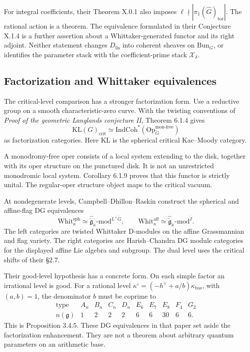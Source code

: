For integral coefficients, their Theorem X.0.1 also imposes
\(\ell\nmid|\pi_1(\widehat G)_{\mathrm{tor}}|\).
The rational action is a theorem. The equivalence formulated
in their Conjecture X.1.4 is a further assertion about a
Whittaker-generated functor and its right adjoint.
Neither statement changes \(D_{\mathrm{lis}}\) into coherent
sheaves on \(\mathrm{Bun}_G\), or identifies the parameter stack
with the coefficient-prime stack \(\mathcal X_\delta\).



\subsection{Factorization and Whittaker equivalences}

The critical-level comparison has a stronger factorization form.
Use a reductive group on a smooth characteristic-zero curve.
With the twisting conventions of
\emph{Proof of the geometric Langlands conjecture II},
Theorem 6.1.4 gives
\[
 \mathrm{KL}(G)_{\mathrm{crit}}
   \simeq
 \mathrm{IndCoh}^{*}
       (\mathrm{Op}_{\check G}^{\mathrm{mon\text{-}free}})
\]
as factorization categories.
Here \(\mathrm{KL}\) is the spherical critical Kac--Moody category.

A monodromy-free oper consists of a local system extending to the
disk, together with its oper structure on the punctured disk.
It is not an unrestricted monodromic local system.
Corollary 6.1.9 proves that this functor is strictly unital.
The regular-oper structure object maps to the critical vacuum.

At nondegenerate levels, Campbell--Dhillon--Raskin construct
the spherical and affine-flag DG equivalences
\[
 \mathrm{Whit}^{\mathrm{sph}}_\kappa
 \simeq\widehat{\check{\mathfrak g}}_{\check\kappa}
                 \text{-}\mathrm{mod}^{L^+\check G},
 \qquad
 \mathrm{Whit}^{\mathrm{aff}}_\kappa
 \simeq\widehat{\check{\mathfrak g}}_{\check\kappa}
                 \text{-}\mathrm{mod}^{\check I}.
\]
The left categories are twisted Whittaker D-modules on the
affine Grassmannian and flag variety. The right categories are
Harish--Chandra DG module categories for the displayed affine
Lie algebra and subgroup.
The dual level uses the critical shifts of their \S2.7.

Their good-level hypothesis has a concrete form.
On each simple factor an irrational level is good.
For a rational level
\(\kappa^\circ=(-h^\vee+a/b)\kappa_{\mathrm{bas}}\),
with \((a,b)=1\), the denominator \(b\) must be coprime to
\[
 \begin{array}{c|ccccccccc}
 \text{type}&A_n&B_n&C_n&D_n&E_6&E_7&E_8&F_4&G_2\\ \hline
 n(\mathfrak g)&1&2&2&2&6&6&30&6&6 .
 \end{array}
\]
This is Proposition 3.4.5.
These DG equivalences in that paper set aside the factorization
enhancement. They are not a theorem about arbitrary quantum
parameters on an arithmetic base.

